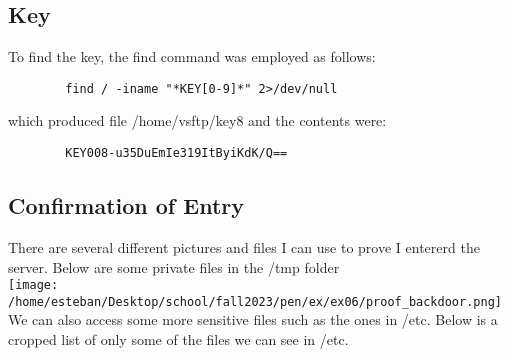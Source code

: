 \documentclass[notitlepage]{article}
\begin{document}
    \subsection{Key}
    To find the key, the find command was employed as follows:
    \begin{verbatim}
        find / -iname "*KEY[0-9]*" 2>/dev/null
    \end{verbatim}
    which produced file /home/vsftp/key8 and the contents were:
    \begin{verbatim}
        KEY008-u35DuEmIe319ItByiKdK/Q==    
    \end{verbatim}

    \subsection{Confirmation of Entry}
        There are several different pictures and files I can use to prove I entererd the server.
        Below are some private files in the /tmp folder\\
\texttt{[image: /home/esteban/Desktop/school/fall2023/pen/ex/ex06/proof\_backdoor.png]}\\
        We can also access some more sensitive files such as the ones in /etc. Below is a cropped list of only some
        of the files we can see in /etc.
\end{document}
